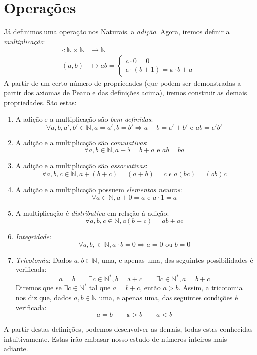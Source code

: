\section{Operações}
Já definimos uma operação nos Naturais, a \emph{adição}. Agora, iremos definir a \emph{multiplicação}:
\begin{align*}
\cdot: \mathbb{N}\times\mathbb{N} &\rightarrow \mathbb{N} \\
(a,b) &\mapsto ab=\begin{cases}
a\cdot 0 = 0 \\
a\cdot (b+1)=a \cdot b + a
\end{cases}
\end{align*} 
A partir de um certo número de propriedades (que podem ser demonstradas a partir dos axiomas de Peano e das definições acima), iremos construir as demais propriedades. São estas:
\begin{enumerate}[1)]
\item A adição e a multiplicação são \emph{bem definidas}: \[\forall a,b,a',b' \in \mathbb{N}, a=a',b=b' \Rightarrow a+b=a'+b'\textrm{ e }ab=a'b'\]
\item A adição e a multiplicação são \emph{comutativas}:\[\forall a,b \in \mathbb{N}, a+b=b+a \textrm{ e }ab=ba\]
\item A adição e a multiplicação são \emph{associativas}: \[\forall a,b,c \in \mathbb{N}, a+(b+c)=(a+b)=c \textrm{ e } a(bc)=(ab)c\]
\item A adição e a multiplicação possuem \emph{elementos neutros}: \[ \forall a \in \mathbb{N}, a+0=a \textrm{ e } a\cdot 1 =a\]
\item A multiplicação é \emph{distributiva }em relação à adição:\[\forall a,b,c \in \mathbb{N}, a(b+c)=ab+ac\]
\item \emph{Integridade}:
\[\forall a,b, \in \mathbb{N}, a\cdot b=0 \Rightarrow a=0 \textrm{ ou }b=0\]
\item \emph{Tricotomia}: Dados $a,b \in \mathbb{N}$, uma, e apenas uma, das seguintes possibilidades é verificada:
\[{a=b} \qquad  {\exists c \in \mathbb{N}^*, b=a+c} \qquad {\exists c \in \mathbb{N}^*, a=b+c}\]
Diremos que se $\exists c \in \mathbb{N}^*$ tal que $a=b+c$, então $a>b$. Assim, a tricotomia nos diz que, dados $a,b \in \mathbb{N}$ uma, e apenas uma, das seguintes condições é verificada:
\[{a=b} \qquad  {a>b} \qquad {a<b}\]
\end{enumerate}
A partir destas definições, podemos desenvolver as demais, todas estas conhecidas intuitivamente. Estas irão embasar nosso estudo de números inteiros mais adiante.

